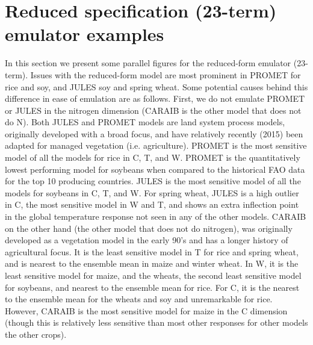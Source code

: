 \documentclass[10pt]{article}
\begin{document}
{{\section{Reduced specification (23-term) emulator examples}
\smallskip
\begin{flushleft}
In this section we present some parallel figures for the reduced-form emulator (23-term). 
Issues with the reduced-form model are most prominent in PROMET for rice and soy, and JULES soy and spring wheat. 
Some potential causes behind this difference in ease of emulation are as follows.
First, we do not emulate PROMET or JULES in the nitrogen dimension (CARAIB is the other model that does not do N). 
Both JULES and PROMET models are land system process models, originally developed with a broad focus, and have relatively recently (2015) been adapted for managed vegetation (i.e. agriculture).
PROMET is the most sensitive model of all the models for rice in C, T, and W. 
PROMET is the quantitatively lowest performing model for soybeans when compared to the historical FAO data for the top 10 producing countries. 
JULES is the most sensitive model of all the models for soybeans in C, T, and W. 
For spring wheat, JULES is a high outlier in C, the most sensitive model in W and T, and shows an extra inflection point in the global temperature response not seen in any of the other models. 
CARAIB on the other hand (the other model that does not do nitrogen), was originally developed as a vegetation model in the early 90's and has a longer history of agricultural focus. It is the least sensitive model in T for rice and spring wheat, and is nearest to the ensemble mean in maize and winter wheat. 
In W, it is the least sensitive model for maize, and the wheats, the second least sensitive model for soybeans, and nearest to the ensemble mean for rice. 
For C, it is the nearest to the ensemble mean for the wheats and soy and unremarkable for rice. 
However, CARAIB is the most sensitive model for maize in the C dimension (though this is relatively less sensitive than most other responses for other models the other crops).
\end{flushleft}

}}
\end{document}
